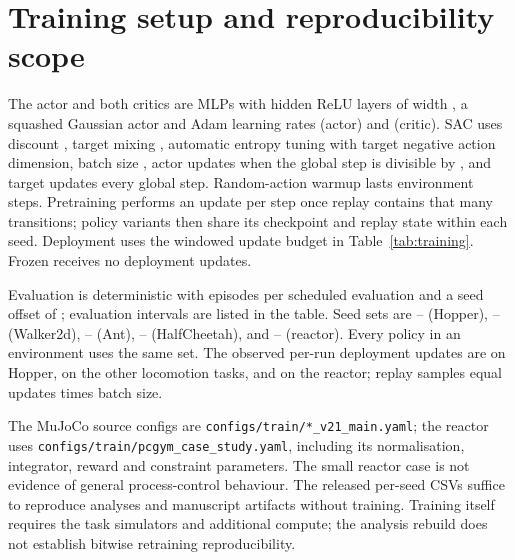 \documentclass{article}
\begin{document}
\clearpage
\section{Training setup and reproducibility scope}
\label{app:training}

The actor and both critics are MLPs with \HiddenLayers{} hidden ReLU layers
of width \HiddenWidth{}, a squashed Gaussian actor and Adam learning rates
\ActorLR{} (actor) and \CriticLR{} (critic). SAC uses discount
\TrainGamma{}, target mixing \TrainTau{}, automatic entropy tuning with
target negative action dimension, batch size \TrainBatch{}, actor updates
when the global step is divisible by \ActorFrequency{}, and target updates
every \TargetFrequency{} global step. Random-action warmup lasts
\LearningStarts{} environment steps. Pretraining performs an update per
step once replay contains that many transitions; policy variants then share
its checkpoint and replay state within each seed. Deployment uses the
windowed update budget in Table~\ref{tab:training}. Frozen receives no
deployment updates.

Evaluation is deterministic with \EvaluationEpisodes{} episodes per
scheduled evaluation and a seed offset of \EvalSeedOffset{}; evaluation
intervals are listed in the table. Seed sets are
\TrainingSeedMinHopper--\TrainingSeedMaxHopper{} (Hopper),
\TrainingSeedMinWalkerTwod--\TrainingSeedMaxWalkerTwod{} (Walker2d),
\TrainingSeedMinAnt--\TrainingSeedMaxAnt{} (Ant),
\TrainingSeedMinHalfcheetah--\TrainingSeedMaxHalfcheetah{} (HalfCheetah), and
\TrainingSeedMinPcgym--\TrainingSeedMaxPcgym{} (reactor). Every policy in an
environment uses the same set. The observed per-run deployment updates are
\ObservedUpdatesHopper{} on Hopper, \ObservedUpdatesWalkerTwod{} on the other
locomotion tasks, and \ObservedUpdatesPcgym{} on the reactor; replay samples
equal updates times batch size.

\begin{table}[h]
\centering
\footnotesize
\setlength{\tabcolsep}{3pt}
\caption{Declared configurations, checked against observed seed grids and
update/sample budgets. Buffer/recent are transition capacities;
window/updates gives environment steps and the allowed updates per window.}
\label{tab:training}

\end{table}

The MuJoCo source configs are \texttt{configs/train/*\_v21\_main.yaml}; the
reactor uses \texttt{configs/train/pcgym\_case\_study.yaml}, including its
normalisation, integrator, reward and constraint parameters. The small reactor
case is not evidence of general process-control behaviour. The released
per-seed CSVs suffice to reproduce analyses and manuscript artifacts without
training. Training itself requires the task simulators and additional compute;
the analysis rebuild does not establish bitwise retraining reproducibility.
\end{document}
